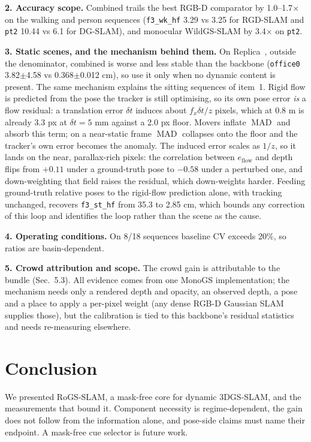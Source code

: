 \textbf{2. Accuracy scope.} Combined trails the best RGB-D comparator by 1.0--1.7$\times$ on the walking and person sequences (\texttt{f3\_wk\_hf} 3.29 vs 3.25 for RGD-SLAM and \texttt{pt2} 10.44 vs 6.1 for DG-SLAM), and monocular WildGS-SLAM by 3.4$\times$ on \texttt{pt2}.


\textbf{3. Static scenes, and the mechanism behind them.} On Replica~\cite{replica}, outside the denominator, combined is worse and less stable than the backbone (\texttt{office0} 3.82$\pm$4.58 vs 0.368$\pm$0.012 cm), so use it only when no dynamic content is present. The same mechanism explains the sitting sequences of item~1. Rigid flow is predicted from the pose the tracker is still optimising, so its own pose error \emph{is} a flow residual: a translation error $\delta t$ induces about $f_x\delta t/z$ pixels, which at 0.8 m is already 3.3 px at $\delta t = 5$ mm against a 2.0 px floor. Movers inflate $\operatorname{MAD}$ and absorb this term; on a near-static frame $\operatorname{MAD}$ collapses onto the floor and the tracker's own error becomes the anomaly. The induced error scales as $1/z$, so it lands on the near, parallax-rich pixels: the correlation between $e_{\text{flow}}$ and depth flips from $+0.11$ under a ground-truth pose to $-0.58$ under a perturbed one, and down-weighting that field raises the residual, which down-weights harder. Feeding ground-truth relative poses to the rigid-flow prediction alone, with tracking unchanged, recovers \texttt{f3\_st\_hf} from 35.3 to 2.85 cm, which bounds any correction of this loop and identifies the loop rather than the scene as the cause.


\textbf{4. Operating conditions.} On 8/18 sequences baseline CV exceeds 20\%, so ratios are basin-dependent.


\textbf{5. Crowd attribution and scope.} The crowd gain is attributable to the bundle (Sec.~5.3). All evidence comes from one MonoGS implementation; the mechanism needs only a rendered depth and opacity, an observed depth, a pose and a place to apply a per-pixel weight (any dense RGB-D Gaussian SLAM supplies those), but the calibration is tied to this backbone's residual statistics and needs re-measuring elsewhere.




\section{Conclusion}
\enlargethispage{5\baselineskip}


We presented RoGS-SLAM, a mask-free core for dynamic 3DGS-SLAM, and the measurements that bound it. Component necessity is regime-dependent, the gain does not follow from the information alone, and pose-side claims must name their endpoint. A mask-free cue selector is future work.



